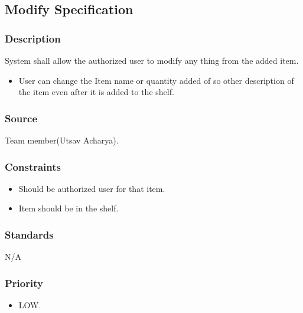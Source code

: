 \subsection{Modify Specification}
\subsubsection{Description}
System shall allow the authorized user to modify any thing from the added item. 
\begin{itemize}
\item User can change the Item name or quantity added of so other description of the item even after it is added to the shelf.
\end{itemize}
\subsubsection{Source}
Team member(Utsav Acharya).
\subsubsection{Constraints}
\begin{itemize}
\item Should be authorized user for that item.
\item Item should be in the shelf.
\end{itemize}
\subsubsection{Standards}
N/A
\subsubsection{Priority}
\begin{itemize}
\item LOW.\\ \\
\end{itemize}
